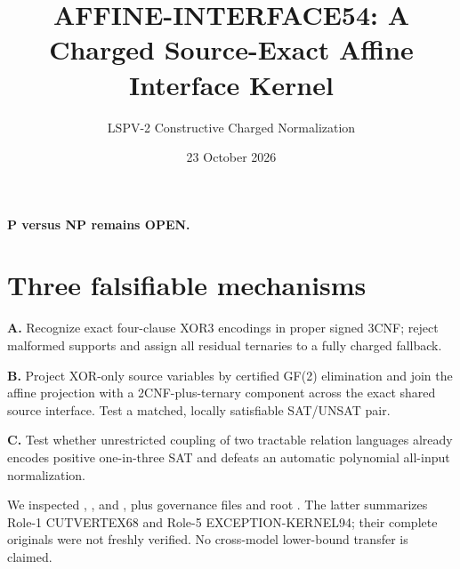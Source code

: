 \documentclass[11pt]{article}
\title{AFFINE-INTERFACE54: A Charged Source-Exact Affine Interface Kernel}
\author{LSPV-2 Constructive Charged Normalization}
\date{23 October 2026}
\begin{document}
\maketitle
\begin{center}\textbf{P versus NP remains OPEN.}\end{center}
\section{Three falsifiable mechanisms}
\noindent\textbf{A.} Recognize exact four-clause XOR3 encodings in proper signed 3CNF; reject malformed supports and assign all residual ternaries to a fully charged fallback.\par
\noindent\textbf{B.} Project XOR-only source variables by certified GF(2) elimination and join the affine projection with a 2CNF-plus-ternary component across the exact shared source interface. Test a matched, locally satisfiable SAT/UNSAT pair.\par
\noindent\textbf{C.} Test whether unrestricted coupling of two tractable relation languages already encodes positive one-in-three SAT and defeats an automatic polynomial all-input normalization.\par
We inspected , , and , plus governance files and root . The latter summarizes Role-1 CUTVERTEX68 and Role-5 EXCEPTION-KERNEL94; their complete originals were not freshly verified. No cross-model lower-bound transfer is claimed.
\end{document}
